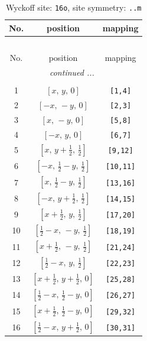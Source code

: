 \documentclass[fleqn,8pt]{jsarticle}
\begin{document}
\renewcommand{\arraystretch}{1.2}
\begin{longtable}{ccc}
\caption{Wyckoff site: {\tt 16o}, site symmetry: {\tt ..m}}
 \\
 \hline \hline
No. & position & mapping \\ \hline \endfirsthead

\multicolumn{2}{l}{\tablename\ \thetable{}} \\
 \hline \hline
No. & position & mapping \\ \hline \endhead

 \hline \hline
\multicolumn{2}{r}{\footnotesize\it continued ...} \\ \endfoot

 \hline \hline
\multicolumn{2}{r}{} \\ \endlastfoot

1 & $\left[ x,\, y,\, 0 \right]$ & {\tt [1,4]} \\ \hline
2 & $\left[ - x,\, - y,\, 0 \right]$ & {\tt [2,3]} \\ \hline
3 & $\left[ x,\, - y,\, 0 \right]$ & {\tt [5,8]} \\ \hline
4 & $\left[ - x,\, y,\, 0 \right]$ & {\tt [6,7]} \\ \hline
5 & $\left[ x,\, y + \frac{1}{2},\, \frac{1}{2} \right]$ & {\tt [9,12]} \\ \hline
6 & $\left[ - x,\, \frac{1}{2} - y,\, \frac{1}{2} \right]$ & {\tt [10,11]} \\ \hline
7 & $\left[ x,\, \frac{1}{2} - y,\, \frac{1}{2} \right]$ & {\tt [13,16]} \\ \hline
8 & $\left[ - x,\, y + \frac{1}{2},\, \frac{1}{2} \right]$ & {\tt [14,15]} \\ \hline
9 & $\left[ x + \frac{1}{2},\, y,\, \frac{1}{2} \right]$ & {\tt [17,20]} \\ \hline
10 & $\left[ \frac{1}{2} - x,\, - y,\, \frac{1}{2} \right]$ & {\tt [18,19]} \\ \hline
11 & $\left[ x + \frac{1}{2},\, - y,\, \frac{1}{2} \right]$ & {\tt [21,24]} \\ \hline
12 & $\left[ \frac{1}{2} - x,\, y,\, \frac{1}{2} \right]$ & {\tt [22,23]} \\ \hline
13 & $\left[ x + \frac{1}{2},\, y + \frac{1}{2},\, 0 \right]$ & {\tt [25,28]} \\ \hline
14 & $\left[ \frac{1}{2} - x,\, \frac{1}{2} - y,\, 0 \right]$ & {\tt [26,27]} \\ \hline
15 & $\left[ x + \frac{1}{2},\, \frac{1}{2} - y,\, 0 \right]$ & {\tt [29,32]} \\ \hline
16 & $\left[ \frac{1}{2} - x,\, y + \frac{1}{2},\, 0 \right]$ & {\tt [30,31]} \\
\end{longtable}
\end{document}
